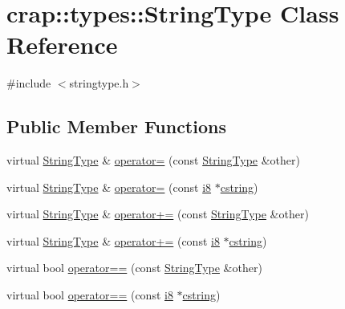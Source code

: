 \hypertarget{classcrap_1_1types_1_1_string_type}{\section{crap\-:\-:types\-:\-:String\-Type Class Reference}
\label{classcrap_1_1types_1_1_string_type}
}


{\ttfamily \#include $<$stringtype.\-h$>$}

\subsection*{Public Member Functions}
\begin{DoxyCompactItemize}
\item 
virtual \hyperlink{classcrap_1_1types_1_1_string_type}{String\-Type} \& \hyperlink{classcrap_1_1types_1_1_string_type_acad035f31c4ad0def1cf1e16152bb661}{operator=} (const \hyperlink{classcrap_1_1types_1_1_string_type}{String\-Type} \&other)
\item 
virtual \hyperlink{classcrap_1_1types_1_1_string_type}{String\-Type} \& \hyperlink{classcrap_1_1types_1_1_string_type_ac00a904d1680cc8c2896b939a43c6b77}{operator=} (const \hyperlink{types_8h_ae3702327b5f47e83b431e22b33da7b58}{i8} $\ast$\hyperlink{types_8h_a5849681cb91aa8afef6996d9d9e90881}{cstring})
\item 
virtual \hyperlink{classcrap_1_1types_1_1_string_type}{String\-Type} \& \hyperlink{classcrap_1_1types_1_1_string_type_ae6c63ca117b295be6787153535b48f74}{operator+=} (const \hyperlink{classcrap_1_1types_1_1_string_type}{String\-Type} \&other)
\item 
virtual \hyperlink{classcrap_1_1types_1_1_string_type}{String\-Type} \& \hyperlink{classcrap_1_1types_1_1_string_type_a7fb89f357d18f99a617bad934070ba22}{operator+=} (const \hyperlink{types_8h_ae3702327b5f47e83b431e22b33da7b58}{i8} $\ast$\hyperlink{types_8h_a5849681cb91aa8afef6996d9d9e90881}{cstring})
\item 
virtual bool \hyperlink{classcrap_1_1types_1_1_string_type_a627e672037b6cb1c6870661ccdae1edd}{operator==} (const \hyperlink{classcrap_1_1types_1_1_string_type}{String\-Type} \&other)
\item 
virtual bool \hyperlink{classcrap_1_1types_1_1_string_type_aadfa940d5d11b655a40c47b58b2dad95}{operator==} (const \hyperlink{types_8h_ae3702327b5f47e83b431e22b33da7b58}{i8} $\ast$\hyperlink{types_8h_a5849681cb91aa8afef6996d9d9e90881}{cstring})
\item 

\end{DoxyCompactItemize}
